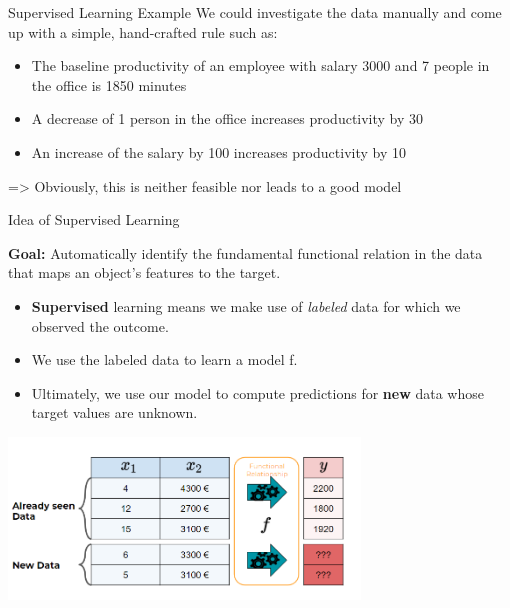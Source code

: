 \documentclass[11pt,compress,t,notes=noshow, xcolor=table]{beamer}
\begin{document}
\begin{vbframe}{Supervised Learning Example}
We could investigate the data manually and come up with a simple, hand-crafted rule such as:
	
	\begin{itemize}
		\item The baseline productivity of an employee with salary 3000 and 7 people in the office is 1850 minutes
		\item A decrease of 1 person in the office increases productivity by 30 
		\item An increase of the salary by 100 increases productivity by 10
	\end{itemize}

=> Obviously, this is neither feasible nor leads to a good model
\end{vbframe}


	
\begin{vbframe}{Idea of Supervised Learning}


\textbf{Goal:} Automatically identify the fundamental functional relation in the data 
  that maps an object's features to the target.

\begin{itemize}

  \item \textbf{Supervised} learning means we make use of \emph{labeled}
  data for which we observed the outcome.
  

  \item We use the labeled data to learn a model f.

  \item Ultimately, we use our model to compute predictions for 
  \textbf{new} data whose target values are unknown.
  
\end{itemize}

\begin{center}
  \includegraphics[width=0.7\textwidth]{figure_man/what_is_a_model_web} 
\end{center}
\end{vbframe}
\end{document}

